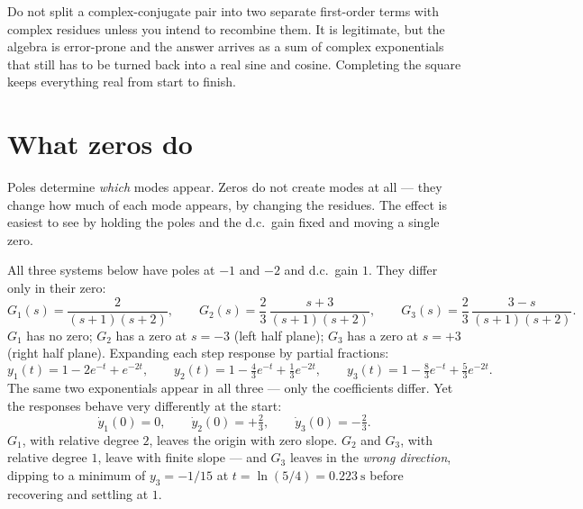 \documentclass[11pt,a4paper]{article}
\begin{document}
\begin{pitfall}
Do not split a complex-conjugate pair into two separate first-order terms with
complex residues unless you intend to recombine them. It is legitimate, but the
algebra is error-prone and the answer arrives as a sum of complex exponentials
that still has to be turned back into a real sine and cosine. Completing the
square keeps everything real from start to finish.
\end{pitfall}

\section{What zeros do}
\label{sec:zeros}

Poles determine \emph{which} modes appear. Zeros do not create modes at all ---
they change how much of each mode appears, by changing the residues. The effect
is easiest to see by holding the poles and the d.c.\ gain fixed and moving a
single zero.

\begin{workedex}[breakable, title={Worked example 3.4 --- one zero, three systems}]
All three systems below have poles at $-1$ and $-2$ and d.c.\ gain $1$. They
differ only in their zero:
\[
  G_1(s) = \frac{2}{(s+1)(s+2)}, \qquad
  G_2(s) = \frac{2}{3}\,\frac{s+3}{(s+1)(s+2)}, \qquad
  G_3(s) = \frac{2}{3}\,\frac{3-s}{(s+1)(s+2)} .
\]
$G_1$ has no zero; $G_2$ has a zero at $s=-3$ (left half plane); $G_3$ has a
zero at $s=+3$ (right half plane). Expanding each step response by partial
fractions:
\[
  y_1(t) = 1 - 2e^{-t} + e^{-2t}, \qquad
  y_2(t) = 1 - \tfrac{4}{3}e^{-t} + \tfrac{1}{3}e^{-2t}, \qquad
  y_3(t) = 1 - \tfrac{8}{3}e^{-t} + \tfrac{5}{3}e^{-2t} .
\]
The same two exponentials appear in all three --- only the coefficients differ.
Yet the responses behave very differently at the start:
\[
  \dot y_1(0)=0, \qquad \dot y_2(0)=+\tfrac{2}{3}, \qquad
  \dot y_3(0)=-\tfrac{2}{3} .
\]
$G_1$, with relative degree $2$, leaves the origin with zero slope. $G_2$ and
$G_3$, with relative degree $1$, leave with finite slope --- and $G_3$ leaves
in the \emph{wrong direction}, dipping to a minimum of $y_3=-1/15$ at
$t=\ln(5/4)=\SI{0.223}{\second}$ before recovering and settling at $1$.
\end{workedex}
\end{document}
